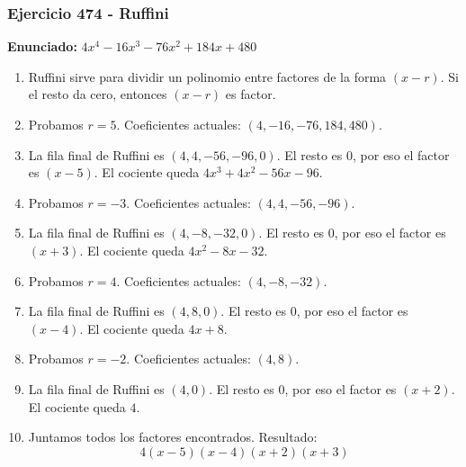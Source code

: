 \documentclass[11pt,a4paper]{article}
\begin{document}
\subsubsection*{Ejercicio 474 - Ruffini}
\textbf{Enunciado:} $ 4 x^{4} - 16 x^{3} - 76 x^{2} + 184 x + 480 $\par
\begin{enumerate}[leftmargin=2em]
\item Ruffini sirve para dividir un polinomio entre factores de la forma \((x-r)\). Si el resto da cero, entonces \((x-r)\) es factor.
\item Probamos \(r=5\). Coeficientes actuales: \((4, -16, -76, 184, 480)\).
\item La fila final de Ruffini es \((4, 4, -56, -96, 0)\). El resto es \(0\), por eso el factor es \((x-5)\). El cociente queda \(4 x^{3} + 4 x^{2} - 56 x - 96\).
\item Probamos \(r=-3\). Coeficientes actuales: \((4, 4, -56, -96)\).
\item La fila final de Ruffini es \((4, -8, -32, 0)\). El resto es \(0\), por eso el factor es \((x+3)\). El cociente queda \(4 x^{2} - 8 x - 32\).
\item Probamos \(r=4\). Coeficientes actuales: \((4, -8, -32)\).
\item La fila final de Ruffini es \((4, 8, 0)\). El resto es \(0\), por eso el factor es \((x-4)\). El cociente queda \(4 x + 8\).
\item Probamos \(r=-2\). Coeficientes actuales: \((4, 8)\).
\item La fila final de Ruffini es \((4, 0)\). El resto es \(0\), por eso el factor es \((x+2)\). El cociente queda \(4\).
\item Juntamos todos los factores encontrados. Resultado: \[\boxed{4 \left(x - 5\right) \left(x - 4\right) \left(x + 2\right) \left(x + 3\right)}\]
\end{enumerate}

\vspace{0.2cm}
\end{document}
